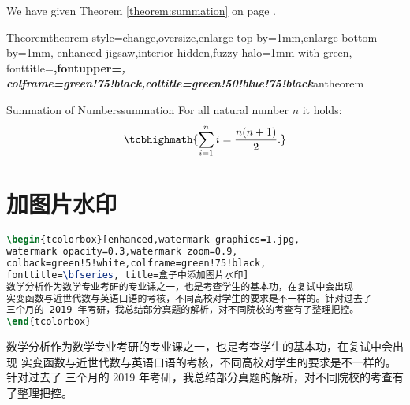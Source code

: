 \documentclass{ctexart}
\begin{document}
We have given Theorem \ref{theorem:summation} on page \pageref{theorem:summation}.

%
{Theorem}{theorem style=change,oversize,enlarge top by=1mm,enlarge bottom by=1mm,
	enhanced jigsaw,interior hidden,fuzzy halo=1mm with green,
	fonttitle=\bfseries\upshape,fontupper=\slshape,
	colframe=green!75!black,coltitle=green!50!blue!75!black}{antheorem}

\begin{antheo}{Summation of Numbers}{summation}
	For all natural number $n$ it holds:
	\begin{equation}
	\tcbhighmath{\sum\limits_{i=1}^n i = \frac{n(n+1)}{2}.}
	\end{equation}
\end{antheo}
\section{加图片水印}
\begin{lstlisting}[language={TeX}]
\begin{tcolorbox}[enhanced,watermark graphics=1.jpg,
watermark opacity=0.3,watermark zoom=0.9,
colback=green!5!white,colframe=green!75!black,
fonttitle=\bfseries, title=盒子中添加图片水印]
数学分析作为数学专业考研的专业课之一，也是考查学生的基本功，在复试中会出现
实变函数与近世代数与英语口语的考核，不同高校对学生的要求是不一样的。针对过去了
三个月的 2019 年考研，我总结部分真题的解析，对不同院校的考查有了整理把控。
\end{tcolorbox}
\end{lstlisting}
\begin{tcolorbox}[enhanced,watermark graphics=1.jpg,
	watermark opacity=0.3,watermark zoom=0.9,
	colback=green!5!white,colframe=green!75!black,
	fonttitle=\bfseries, title=盒子中添加图片水印]
	数学分析作为数学专业考研的专业课之一，也是考查学生的基本功，在复试中会出现
	实变函数与近世代数与英语口语的考核，不同高校对学生的要求是不一样的。针对过去了
	三个月的 2019 年考研，我总结部分真题的解析，对不同院校的考查有了整理把控。
\end{tcolorbox}

\end{document}
